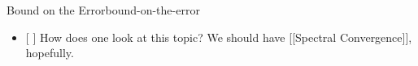 \begin{definition}{Bound on the Error}{bound-on-the-error}
  \begin{itemize}
    \tightlist
    \item
          {[} {]} How does one look at this topic? We should have {[}{[}Spectral
          Convergence{]}{]}, hopefully.
  \end{itemize}
\end{definition}
